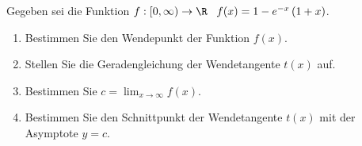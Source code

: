 \begin{ExerciseBlock}
Gegeben sei die Funktion $f: [0,\infty) \rightarrow \R \;\;\; f(x) = 1 - e^{-x} \left(1+x\right)$.
\begin{enumerate}[label=\alph*)]
	
	\item Bestimmen Sie den Wendepunkt der Funktion $f(x)$.
	
	\item Stellen Sie die Geradengleichung der Wendetangente $t(x)$ auf.
	\item Bestimmen Sie $c = \lim_{x \rightarrow \infty} f(x)$.
	
	\item Bestimmen Sie den Schnittpunkt der Wendetangente $t(x)$ mit der Asymptote $y=c$.
\end{enumerate}

\end{ExerciseBlock}
